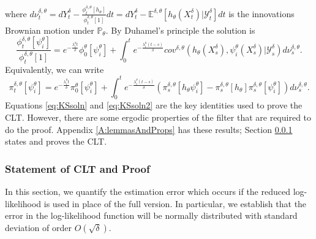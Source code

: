 \documentclass{article}
\begin{document}
where $d\nu_t^{\delta,\theta} = dY^{\delta}_t - \frac{\phi_t^{\delta,\theta}[h_{\theta}]}{\phi_t^{\delta,\theta}[1]}dt=dY^{\delta}_t -\mathbb E^{\delta,\theta}[h_{\theta}(X^{\delta}_t)|\mathcal{Y}^{\delta}_{t}]dt$ is the innovations Brownian motion under $\mathbb{P}_{\theta}$. By Duhamel's  principle the solution is
\begin{equation}
\label{eq:KSsoln}
\frac{\phi_t^{\delta,\theta}[\psi_i^{\theta}]}{\phi_t^{\delta,\theta}[1]} = e^{-\frac{\lambda_i^{\theta} t}{\delta}}\phi_0^{\theta}[\psi_i^{\theta}]+\int_0^t e^{-\frac{\lambda_i^{\theta}(t-s)}{\delta}}cov^{\delta,\theta}\left(h_{\theta}(X^{\delta}_s),\psi_i^{\theta}(X^{\delta}_s)\Big|\mathcal{Y}^{\delta}_{s}\right)d\nu_s^{\delta,\theta}.
\end{equation}
Equivalently, we can write
\begin{equation}
\label{eq:KSsoln2}
\pi_t^{\delta,\theta}[\psi_i^{\theta}] = e^{-\frac{\lambda_i^{\theta} t}{\delta}}\pi_0^{\theta}[\psi_i^{\theta}]+\int_0^t e^{-\frac{\lambda_i^{\theta}(t-s)}{\delta}}
\left(\pi_s^{\delta,\theta}[h_{\theta}\psi_i^{\theta}]-\pi_s^{\delta,\theta}[h_{\theta}]\pi_s^{\delta,\theta}[\psi_i^{\theta}]\right)
d\nu_s^{\delta,\theta}.
\end{equation}
Equations \eqref{eq:KSsoln} and \eqref{eq:KSsoln2} are the key identities used to prove the CLT. However, there are some ergodic properties of the filter that are required to do the proof. Appendix \ref{A:lemmasAndProps} has these results; Section \ref{SS:CLT} states and proves the CLT.

\subsubsection{Statement of CLT and Proof}\label{SS:CLT}
In this section, we quantify the estimation error which occurs if the reduced log-likelihood is used in place of the full version. In particular, we establish that the error in the log-likelihood function will be normally distributed with standard deviation of order $O(\sqrt\delta)$.
\end{document}
